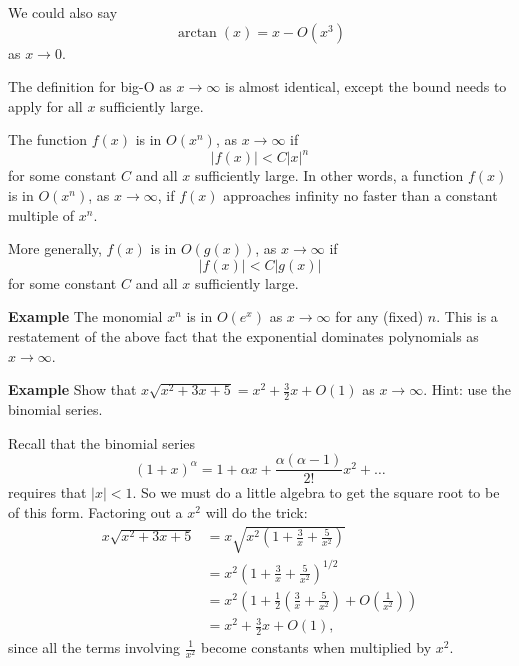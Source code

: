 \documentclass[twoside,openright,titlepage,a4paper]{book}
\begin{document}
\begin{sloppypar}
\begin{examplebox}
We could also say \[ \arctan(x)= x - O(x^3) \] as $x \rightarrow 0$.
\end{examplebox}

The definition for big-O as $x \rightarrow \infty$ is almost identical, except the bound needs to apply for all $x$ sufficiently large.

\begin{definitionbox}[title=\textbf{Big-O notation, $x \rightarrow \infty$}]
The function $f(x)$ is in $O(x^n)$, as $x \rightarrow \infty$ if \[ |f(x)| < C|x|^n \] for some constant $C$ and all $x$ sufficiently large. In other words, a function $f(x)$ is in $O(x^n)$, as $x \rightarrow \infty$, if $f(x)$ approaches infinity no faster than a constant multiple of $x^n$.

More generally, $f(x)$ is in $O(g(x))$, as $x \rightarrow \infty$ if \[ |f(x)| < C |g(x)| \] for some constant $C$ and all $x$ sufficiently large.
\end{definitionbox}

\textbf{Example} The monomial $x^n$ is in $O(e^x)$ as $x \rightarrow \infty$ for any (fixed) $n$. This is a restatement of the above fact that the exponential dominates polynomials as $x \rightarrow \infty$.

\textbf{Example} Show that $x \sqrt{x^2 + 3x + 5} = x^2 + \frac{3}{2}x + O(1)$ as $x \rightarrow \infty$. Hint: use the binomial series.
\begin{examplebox}
Recall that the binomial series \[ (1+x)^\alpha = 1 + \alpha x + \frac{\alpha (\alpha - 1)}{2!} x^2 + \ldots \] requires that $|x|<1$. So we must do a little algebra to get the square root to be of this form. Factoring out a $x^2$ will do the trick:
\begin{align*} 
x \sqrt{x^2+3x+5} &= x \sqrt{x^2 \left( 1 + \frac{3}{x} + \frac{5}{x^2} \right)} \\
&= x^2 \left(1 + \frac{3}{x} + \frac{5}{x^2} \right)^{1/2} \\
&= x^2 \left( 1 + \frac{1}{2}\left(\frac{3}{x} + \frac{5}{x^2}\right) + O\left(\frac{1}{x^2}\right) \right) \\
&= x^2 + \frac{3}{2}x + O(1), 
\end{align*}
since all the terms involving $\frac{1}{x^2}$ become constants when multiplied by $x^2$.
\end{examplebox}


\end{sloppypar}
\end{document}
